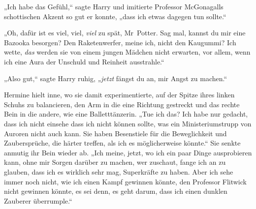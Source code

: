 „Ich habe das Gefühl,“ sagte Harry und imitierte Professor McGonagalls schottischen Akzent so gut er konnte, „dass ich etwas dagegen tun sollte.“

„Oh, dafür ist es viel, viel, \emph{viel} zu spät, Mr~Potter. Sag mal, kannst du mir eine Bazooka besorgen? Den Raketenwerfer, meine ich, nicht den Kaugummi? Ich wette, \emph{das} werden sie von einem jungen Mädchen nicht erwarten, vor allem, wenn ich eine Aura der Unschuld und Reinheit ausstrahle.“

„Also gut,“ sagte Harry ruhig, \emph{„jetzt} fängst du an, mir Angst zu machen.“

Hermine hielt inne, wo sie damit experimentierte, auf der Spitze ihres linken Schuhs zu balancieren, den Arm in die eine Richtung gestreckt und das rechte Bein in die andere, wie eine Balletttänzerin.
„Tue ich das? Ich habe nur gedacht, dass ich nicht einsehe dass ich nicht können sollte, was ein Ministeriumstrupp von Auroren nicht auch kann. Sie haben Besenstiele für die Beweglichkeit und Zaubersprüche, die härter treffen, als ich es möglicherweise könnte.“
Sie senkte anmutig ihr Bein wieder ab.
„Ich meine, jetzt, wo ich ein paar Dinge ausprobieren kann, ohne mir Sorgen darüber zu machen, wer zuschaut, fange ich an zu glauben, dass ich es wirklich sehr mag, Superkräfte zu haben. Aber ich sehe immer noch nicht, wie ich einen Kampf gewinnen könnte, den Professor Flitwick nicht gewinnen könnte, es sei denn, es geht darum, dass ich einen dunklen Zauberer überrumple.“

